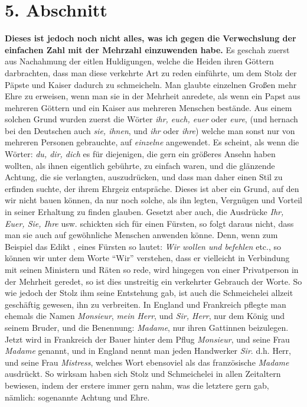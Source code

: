 \section{5. Abschnitt} \label{kap10_ab5}

\textbf{Dieses ist jedoch noch nicht alles, was ich gegen die Verwechslung der
einfachen Zahl mit der Mehrzahl einzuwenden habe.} Es geschah zuerst aus
Nachahmung der eitlen Huldigungen, welche die Heiden
ihren Göttern darbrachten,
dass man diese verkehrte Art zu reden einführte, um dem Stolz der
Päpste und
Kaiser dadurch zu schmeicheln.
Man glaubte einzelnen Großen mehr Ehre zu
erweisen, wenn man sie in der Mehrheit anredete, als wenn ein Papst aus mehreren
Göttern und ein Kaiser aus mehreren Menschen bestände. Aus einem solchen Grund
wurden zuerst die Wörter \textit{ihr, euch, euer} oder \textit{eure}, (und
hernach bei
den Deutschen auch \textit{sie, ihnen}, und \textit{ihr} oder \textit{ihre})
welche man sonst
nur von mehreren Personen gebrauchte, auf \textit{einzelne} angewendet. Es
scheint,
als wenn die Wörter: \textit{du, dir, dich} es für diejenigen, die gern ein
größeres
Ansehn haben wollten, als ihnen eigentlich gebührte, zu einfach waren, und die
glänzende Achtung, die sie verlangten, auszudrücken, und dass man daher einen
Stil zu erfinden suchte, der ihrem Ehrgeiz entspräche. Dieses ist aber ein
Grund, auf den wir nicht bauen können, da nur noch solche, als ihn legten,
Vergnügen und Vorteil in seiner Erhaltung zu finden glauben. Gesetzt aber auch,
die Ausdrücke \textit{Ihr, Euer, Sie, Ihre} usw. schickten sich für einen
Fürsten,
so folgt daraus nicht, dass man sie auch auf gewöhnliche Menschen anwenden
könne.
Denn, wenn zum Beispiel das Edikt ,
eines Fürsten so lautet: \textit{Wir wollen und
befehlen}
etc., so können wir unter dem Worte "`Wir"' verstehen, dass er vielleicht in
Verbindung mit seinen Ministern und Räten so rede, wird hingegen von einer
Privatperson in der Mehrheit geredet, so ist dies unstreitig ein verkehrter
Gebrauch der Worte. So wie jedoch der Stolz ihm seine Entstehung gab, ist auch
die Schmeichelei allzeit geschäftig gewesen, ihn zu verbreiten. In England und
Frankreich pflegte man ehemals die Namen \textit{Monsieur}, \textit{mein
Herr}, und
\textit{Sir, Herr}, nur dem König und seinem Bruder, und die Benennung:
\textit{Madame},
nur ihren Gattinnen beizulegen. Jetzt wird in Frankreich der
Bauer hinter dem
Pflug \textit{Monsieur}, und seine Frau \textit{Madame} genannt, und in England
nennt man
jeden Handwerker \textit{Sir}. d.h. Herr, und
seine
Frau \textit{Mistress}, welches Wort
ebensoviel als das französische \textit{Madame} ausdrückt. So wirksam haben sich
Stolz und
Schmeichelei in allen Zeitaltern bewiesen, indem der erstere immer gern nahm,
was die letztere gern gab, nämlich: sogenannte Achtung und Ehre.


